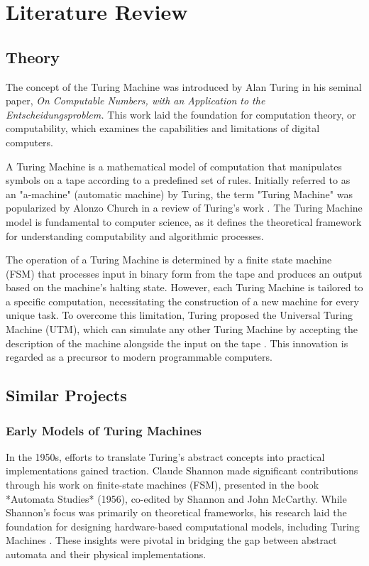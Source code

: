 \chapter{Literature Review}

\section{Theory}

The concept of the Turing Machine was introduced by Alan Turing in his seminal paper, \textit{On Computable Numbers, with an Application to the Entscheidungsproblem.\cite{turing1936}} This work laid the foundation for computation theory, or computability, which examines the capabilities and limitations of digital computers.  

A Turing Machine is a mathematical model of computation that manipulates symbols on a tape according to a predefined set of rules. Initially referred to as an "a-machine" (automatic machine) by Turing, the term "Turing Machine" was popularized by Alonzo Church in a review of Turing's work \cite{church1937}. The Turing Machine model is fundamental to computer science, as it defines the theoretical framework for understanding computability and algorithmic processes.  

The operation of a Turing Machine is determined by a finite state machine (FSM) that processes input in binary form from the tape and produces an output based on the machine's halting state. However, each Turing Machine is tailored to a specific computation, necessitating the construction of a new machine for every unique task. To overcome this limitation, Turing proposed the Universal Turing Machine (UTM), which can simulate any other Turing Machine by accepting the description of the machine alongside the input on the tape \cite{turing1936}. This innovation is regarded as a precursor to modern programmable computers.  

\section{Similar Projects}

\subsection{Early Models of Turing Machines}

In the 1950s, efforts to translate Turing's abstract concepts into practical implementations gained traction. Claude Shannon made significant contributions through his work on finite-state machines (FSM), presented in the book *Automata Studies* (1956), co-edited by Shannon and John McCarthy. While Shannon's focus was primarily on theoretical frameworks, his research laid the foundation for designing hardware-based computational models, including Turing Machines \cite{shannon1956}. These insights were pivotal in bridging the gap between abstract automata and their physical implementations.  

